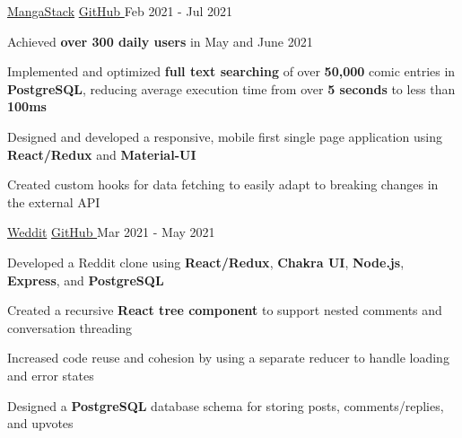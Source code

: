 
\begin{cventries}
  \cventry
    {\fontsize{10pt}{1em}\bodyfont\upshape{}} %
    {\href{https://mangastack.cf/}{MangaStack}} %
    {\href{https://github.com/tacticaltofu/mangastack}{GitHub \faExternalLink}} %
    {Feb 2021 - Jul 2021} %
    {
      \begin{cvitems} %
        \item {Achieved \textbf{over 300 daily users} in May and June 2021}
        \item {Implemented and optimized \textbf{full text searching} of over \textbf{50,000} comic entries in \textbf{PostgreSQL}, reducing average execution time from over \textbf{5 seconds} to less than \textbf{100ms}}
        \item {Designed and developed a responsive, mobile first single page application using \textbf{React/Redux} and \textbf{Material-UI}}
        \item {Created custom hooks for data fetching to easily adapt to breaking changes in the external API}
      \end{cvitems}
    }
    
  \cventry
    {\fontsize{10pt}{1em}\bodyfont\upshape{}} %
    {\href{https://weddit.netlify.app/}{Weddit}} %
    {\href{https://github.com/tacticaltofu/reddit-clone}{GitHub \faExternalLink}} %
    {Mar 2021 - May 2021} %
    {
      \begin{cvitems} %
        \item {Developed a Reddit clone using \textbf{React/Redux}, \textbf{Chakra UI}, \textbf{Node.js}, \textbf{Express}, and \textbf{PostgreSQL}}
        \item {Created a recursive \textbf{React tree component} to support nested comments and conversation threading}
        \item {Increased code reuse and cohesion by using a separate reducer to handle loading and error states}
        \item {Designed a \textbf{PostgreSQL} database schema for storing posts, comments/replies, and upvotes}
      \end{cvitems}
    }
\end{cventries}